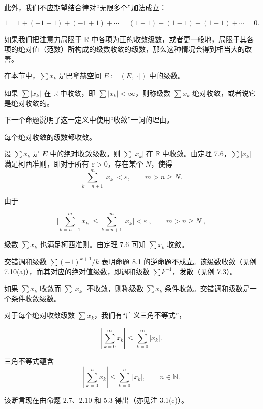 此外，我们不应期望结合律对“无限多个”加法成立：

\[
1=1+\left(-1+1\right)+\left(-1+1\right)+\cdots=\left(1-1\right)+\left(1-1\right)+\left(1-1\right)+\cdots=0.
\]

如果我们把注意力局限于 $ \mathbb{R} $ 中各项为正的收敛级数，或者更一般地，局限于其各项的绝对值（范数）所构成的级数收敛的级数，那么这种情况会得到相当大的改善。

在本节中，$ \sum x_k $ 是巴拿赫空间 $ E := (E, |\cdot|) $ 中的级数。

如果 $ \sum |x_k| $ 在 $ \mathbb{R} $ 中收敛，即 $ \sum |x_k| < \infty $，则称级数 $ \sum x_k $ 绝对收敛，或者说它是绝对收敛的。

下一个命题说明了这一定义中使用“收敛”一词的理由。

\begin{proposition}

每个绝对收敛的级数都收敛。

\proofhead
设 $ \sum x_k $ 是 $ E $ 中的绝对收敛级数。则 $ \sum |x_k| $ 在 $ \mathbb{R} $ 中收敛。由定理 7.6，$ \sum |x_k| $ 满足柯西准则，即对于所有 $ \varepsilon > 0 $，存在某个 $ N $，使得
\[
\sum_{k=n+1}^{m}\left|x_{k}\right|<\varepsilon,\qquad m>n\geq N.
\]

由于

\begin{equation}
\Big|\sum_{k=n+1}^{m}x_{k}\Big|\leq\sum_{k=n+1}^{m}|x_{k}|<\varepsilon\;,\qquad m>n\geq N\;,
\end{equation}

级数 $ \sum x_k $ 也满足柯西准则。由定理 7.6 可知 $ \sum x_k $ 收敛。

\end{proposition}

\begin{remark}

\begin{items}
\item

交错调和级数 $ \sum(-1)^{k+1}/k $ 表明命题 8.1 的逆命题不成立。该级数收敛（见例 7.10(a)），而其对应的绝对值级数，即调和级数 $ \sum k^{-1} $，发散（见例 7.3）。

\item

如果 $ \sum x_k $ 收敛而 $ \sum |x_k| $ 不收敛，则称级数 $ \sum x_k $ 条件收敛。交错调和级数是一个条件收敛级数。

\item

对于每个绝对收敛级数 $ \sum x_k $，我们有“广义三角不等式”，

\[
\left|\sum_{k=0}^{\infty}x_{k}\right|\leq\sum_{k=0}^{\infty}\left|x_{k}\right|.
\]

\proofhead
三角不等式蕴含
\[
\left|\sum_{k=0}^{n}x_{k}\right|\leq\sum_{k=0}^{n}\left|x_{k}\right|,\qquad n\in\mathbb{N}.
\]

该断言现在由命题 2.7、2.10 和 5.3 得出（亦见注 3.1(c)）。

\end{items}

\end{remark}

